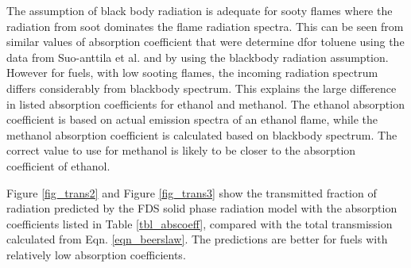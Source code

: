 The assumption of black body radiation is adequate for sooty flames where the radiation from soot dominates the flame radiation spectra. This can be seen from similar values of absorption coefficient that were determine dfor toluene using the data from Suo-anttila et al. and  by using the blackbody radiation assumption. However for fuels, with low sooting flames, the incoming radiation spectrum differs considerably from blackbody spectrum. This explains the large difference in listed absorption coefficients for ethanol and methanol. The ethanol absorption coefficient is based on actual emission spectra of an ethanol flame,  while the methanol absorption coefficient is calculated based on blackbody spectrum. The correct value to use for methanol is likely to be closer to the absorption coefficient of ethanol. 

Figure \ref{fig_trans2} and Figure \ref{fig_trans3} show the transmitted fraction of radiation predicted by the FDS solid phase radiation model with the absorption coefficients listed in Table \ref{tbl_abscoeff}, compared with the total transmission calculated from Eqn. \ref{eqn_beerslaw}. The predictions are better for fuels with relatively low absorption coefficients. 

